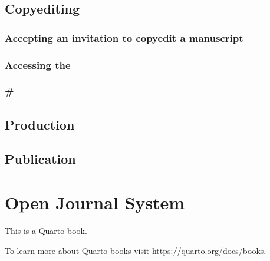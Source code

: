 \documentclass[
  letterpaper,
  DIV=11,
  numbers=noendperiod]{scrreprt}
\begin{document}

\section*{Copyediting}\label{copyediting}


\subsection*{Accepting an invitation to copyedit a
manuscript}\label{accepting-an-invitation-to-copyedit-a-manuscript}

\subsection*{Accessing the}\label{accessing-the}

\subsection*{\#}\label{section}

\section*{Production}\label{production}


\section*{Publication}\label{publication}


\chapter*{Open Journal System}\label{open-journal-system}


This is a Quarto book.

To learn more about Quarto books visit
\url{https://quarto.org/docs/books}.
\end{document}
